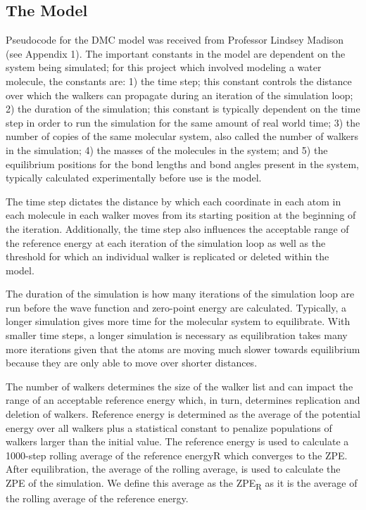 \documentclass[journal=jacsat,manuscript=article]{achemso}
\begin{document}
\subsection{The Model}

Pseudocode for the DMC model was received from Professor Lindsey Madison (see Appendix 1). The important constants in the model are dependent on the system being simulated; for this project which involved modeling a water molecule, the constants are: 1) the time step; this constant controls the distance over which the walkers can propagate during an iteration of the simulation loop; 2) the duration of the simulation; this constant is typically dependent on the time step in order to run the simulation for the same amount of real world time; 3) the number of copies of the same molecular system, also called the number of walkers in the simulation; 4) the masses of the molecules in the system; and 5) the equilibrium positions for the bond lengths and bond angles present in the system, typically calculated experimentally before use is the model. 

The time step dictates the distance by which each coordinate in each atom in each molecule in each walker moves from its starting position at the beginning of the iteration. Additionally, the time step also influences the acceptable range of the reference energy at each iteration of the simulation loop as well as the threshold for which an individual walker is replicated or deleted within the model. 

The duration of the simulation is how many iterations of the simulation loop are run before the wave function and zero-point energy are calculated. Typically, a longer simulation gives more time for the molecular system to equilibrate. With smaller time steps, a longer simulation is necessary as equilibration takes many more iterations given that the atoms are moving much slower towards equilibrium because they are only able to move over shorter distances. 

The number of walkers determines the size of the walker list and can impact the range of an acceptable reference energy which, in turn, determines replication and deletion of walkers. Reference energy is determined as the average of the potential energy over all walkers plus a statistical constant to penalize populations of walkers larger than the initial value. The reference energy is used to calculate a 1000-step rolling average of the reference energyR which converges to the ZPE. After equilibration, the average of the rolling average, is used to calculate the ZPE of the simulation. We define this average as the ZPE\textsubscript{R} as it is the average of the rolling average of the reference energy. 
\end{document}
